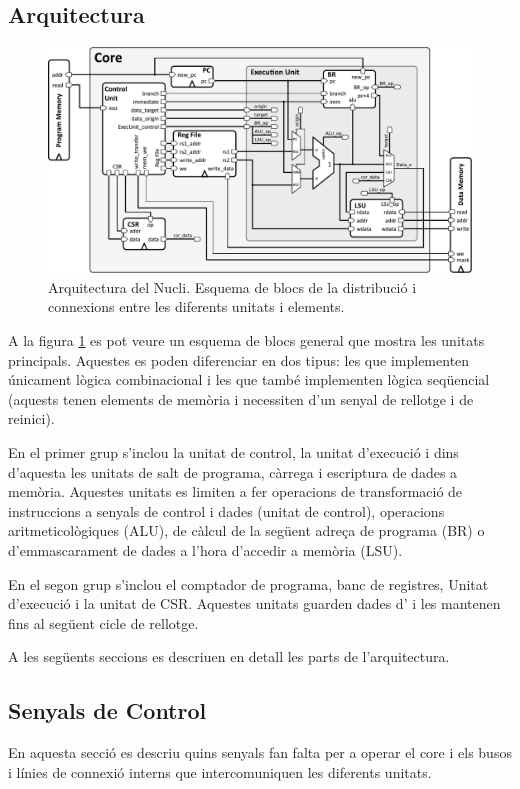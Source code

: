 \documentclass[10pt,a4paper,twocolumn,twoside]{article}
\begin{document}
        
    
    \subsection{Arquitectura}
    \label{sec:arch}
    \begin{figure}[!ht]
    \centering
    	\includegraphics[width=0.9\linewidth]{pdf/arch_RiscV.pdf}
        \caption{Arquitectura del Nucli. Esquema de blocs de la distribució i connexions entre les diferents unitats i elements.}
        \label{fig:core_arch}
    \end{figure}
    
    A la figura \ref{fig:core_arch} es pot veure un esquema de blocs general que mostra les unitats principals. Aquestes es poden diferenciar en dos tipus: les que implementen únicament lògica combinacional i les que també implementen lògica seqüencial (aquests tenen elements de memòria i necessiten d'un senyal de rellotge i de reinici).
    
    En el primer grup s'inclou la unitat de control, la unitat d'execució i dins d'aquesta les unitats de salt de programa, càrrega i escriptura de dades a memòria. Aquestes unitats es limiten a fer operacions de transformació de instruccions a senyals de control i dades (unitat de control), operacions aritmeticològiques (ALU), de càlcul de la següent adreça de programa (BR) o d'emmascarament de dades a l'hora d'accedir a memòria (LSU).
    
    En el segon grup s'inclou el comptador de programa, banc de registres, Unitat d'execució i la unitat de CSR.
    Aquestes unitats guarden dades d'
    i les mantenen fins al següent cicle de rellotge. 
    
    
    A les següents seccions es descriuen en detall les parts de l'arquitectura.
    \subsection{Senyals de Control}
    En aquesta secció es descriu quins senyals fan falta per a operar el core i els busos i línies de connexió interns que intercomuniquen les diferents unitats.
        
\end{document}
